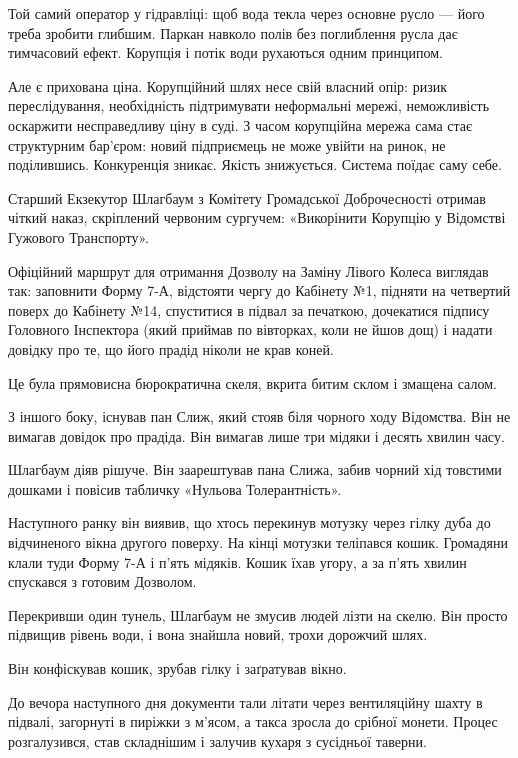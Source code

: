 \documentclass[12pt, a4paper, openany]{book}
\begin{document}
\begin{analogybox}
Той самий оператор у гідравліці: щоб вода текла через основне русло --- його треба зробити глибшим. Паркан навколо полів без поглиблення русла дає тимчасовий ефект. Корупція і потік води рухаються одним принципом.
\end{analogybox}

Але є прихована ціна. Корупційний шлях несе свій власний опір: ризик переслідування, необхідність підтримувати неформальні мережі, неможливість оскаржити несправедливу ціну в суді. З часом корупційна мережа сама стає структурним бар'єром: новий підприємець не може увійти на ринок, не поділившись. Конкуренція зникає. Якість знижується. Система поїдає саму себе.


\begin{terrybox}
Старший Екзекутор Шлагбаум з Комітету Громадської Доброчесності отримав чіткий наказ, скріплений червоним сургучем: «Викорінити Корупцію у Відомстві Гужового Транспорту».

Офіційний маршрут для отримання Дозволу на Заміну Лівого Колеса виглядав так: заповнити Форму 7-А, відстояти чергу до Кабінету №1, підняти на четвертий поверх до Кабінету №14, спуститися в підвал за печаткою, дочекатися підпису Головного Інспектора (який приймав по вівторках, коли не йшов дощ) і надати довідку про те, що його прадід ніколи не крав коней.

Це була прямовисна бюрократична скеля, вкрита битим склом і змащена салом.

З іншого боку, існував пан Слиж, який стояв біля чорного ходу Відомства. Він не вимагав довідок про прадіда. Він вимагав лише три мідяки і десять хвилин часу.

Шлагбаум діяв рішуче. Він заарештував пана Слижа, забив чорний хід товстими дошками і повісив табличку «Нульова Толерантність».

Наступного ранку він виявив, що хтось перекинув мотузку через гілку дуба до відчиненого вікна другого поверху. На кінці мотузки теліпався кошик. Громадяни клали туди Форму 7-А і п'ять мідяків. Кошик їхав угору, а за п'ять хвилин спускався з готовим Дозволом.

Перекривши один тунель, Шлагбаум не змусив людей лізти на скелю. Він просто підвищив рівень води, і вона знайшла новий, трохи дорожчий шлях.

Він конфіскував кошик, зрубав гілку і заґратував вікно.

До вечора наступного дня документи тали літати через вентиляційну шахту в підвалі, загорнуті в пиріжки з м'ясом, а такса зросла до срібної монети. Процес розгалузився, став складнішим і залучив кухаря з сусідньої таверни.


\end{terrybox}
\end{document}
